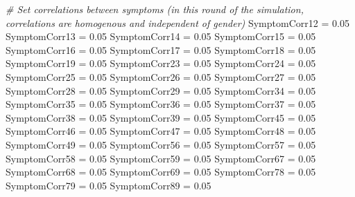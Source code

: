 \documentclass[]{article}
\newenvironment{Shaded}{\begin{snugshade}}{\end{snugshade}}
\newcommand{\FloatTok}[1]{\textcolor[rgb]{0.00,0.00,0.81}{#1}}
\newcommand{\StringTok}[1]{\textcolor[rgb]{0.31,0.60,0.02}{#1}}
\newcommand{\CommentTok}[1]{\textcolor[rgb]{0.56,0.35,0.01}{\textit{#1}}}
\newcommand{\NormalTok}[1]{#1}
\begin{document}
\begin{Shaded}
\begin{Highlighting}[]
\CommentTok{# Set correlations between symptoms (in this round of the simulation, correlations are homogenous and independent of gender)}
\NormalTok{SymptomCorr12 =}\StringTok{ }\FloatTok{0.05}
\NormalTok{SymptomCorr13 =}\StringTok{ }\FloatTok{0.05}
\NormalTok{SymptomCorr14 =}\StringTok{ }\FloatTok{0.05}
\NormalTok{SymptomCorr15 =}\StringTok{ }\FloatTok{0.05}
\NormalTok{SymptomCorr16 =}\StringTok{ }\FloatTok{0.05}
\NormalTok{SymptomCorr17 =}\StringTok{ }\FloatTok{0.05}
\NormalTok{SymptomCorr18 =}\StringTok{ }\FloatTok{0.05}
\NormalTok{SymptomCorr19 =}\StringTok{ }\FloatTok{0.05}
\NormalTok{SymptomCorr23 =}\StringTok{ }\FloatTok{0.05}
\NormalTok{SymptomCorr24 =}\StringTok{ }\FloatTok{0.05}
\NormalTok{SymptomCorr25 =}\StringTok{ }\FloatTok{0.05}
\NormalTok{SymptomCorr26 =}\StringTok{ }\FloatTok{0.05}
\NormalTok{SymptomCorr27 =}\StringTok{ }\FloatTok{0.05}
\NormalTok{SymptomCorr28 =}\StringTok{ }\FloatTok{0.05}
\NormalTok{SymptomCorr29 =}\StringTok{ }\FloatTok{0.05}
\NormalTok{SymptomCorr34 =}\StringTok{ }\FloatTok{0.05}
\NormalTok{SymptomCorr35 =}\StringTok{ }\FloatTok{0.05}
\NormalTok{SymptomCorr36 =}\StringTok{ }\FloatTok{0.05}
\NormalTok{SymptomCorr37 =}\StringTok{ }\FloatTok{0.05}
\NormalTok{SymptomCorr38 =}\StringTok{ }\FloatTok{0.05}
\NormalTok{SymptomCorr39 =}\StringTok{ }\FloatTok{0.05}
\NormalTok{SymptomCorr45 =}\StringTok{ }\FloatTok{0.05}
\NormalTok{SymptomCorr46 =}\StringTok{ }\FloatTok{0.05}
\NormalTok{SymptomCorr47 =}\StringTok{ }\FloatTok{0.05}
\NormalTok{SymptomCorr48 =}\StringTok{ }\FloatTok{0.05}
\NormalTok{SymptomCorr49 =}\StringTok{ }\FloatTok{0.05}
\NormalTok{SymptomCorr56 =}\StringTok{ }\FloatTok{0.05}
\NormalTok{SymptomCorr57 =}\StringTok{ }\FloatTok{0.05}
\NormalTok{SymptomCorr58 =}\StringTok{ }\FloatTok{0.05}
\NormalTok{SymptomCorr59 =}\StringTok{ }\FloatTok{0.05}
\NormalTok{SymptomCorr67 =}\StringTok{ }\FloatTok{0.05}
\NormalTok{SymptomCorr68 =}\StringTok{ }\FloatTok{0.05}
\NormalTok{SymptomCorr69 =}\StringTok{ }\FloatTok{0.05}
\NormalTok{SymptomCorr78 =}\StringTok{ }\FloatTok{0.05}
\NormalTok{SymptomCorr79 =}\StringTok{ }\FloatTok{0.05}
\NormalTok{SymptomCorr89 =}\StringTok{ }\FloatTok{0.05}


\end{Highlighting}
\end{Shaded}
\end{document}
